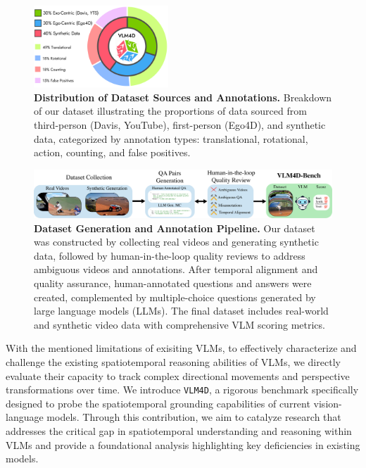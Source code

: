 \begin{figure}[t]
    \centering
    \includegraphics[width=0.45\textwidth]{figures/piechart_dataset_stats.pdf}
    \caption{\textbf{Distribution of Dataset Sources and Annotations.} Breakdown of our dataset illustrating the proportions of data sourced from third-person (Davis, YouTube), first-person (Ego4D), and synthetic data, categorized by annotation types: translational, rotational, action, counting, and false positives.}
    \label{fig:data_piechart}
    \vspace{-0.3cm}
\end{figure}

\begin{figure}[ht]
    \centering
    \includegraphics[width=1\textwidth]{figures/dataset_generation_v2.pdf}
    \caption{\textbf{Dataset Generation and Annotation Pipeline.} Our dataset was constructed by collecting real videos and generating synthetic data, followed by human-in-the-loop quality reviews to address ambiguous videos and annotations. After temporal alignment and quality assurance, human-annotated questions and answers were created, complemented by multiple-choice questions generated by large language models (LLMs). The final dataset includes real-world and synthetic video data with comprehensive VLM scoring metrics.}
    \label{fig:dataset_pipeline}
    \vspace{-0.4cm}
\end{figure}

With the mentioned limitations of exisiting VLMs, to effectively characterize and challenge the existing spatiotemporal reasoning abilities of VLMs, we directly evaluate their capacity to track complex directional movements and perspective transformations over time. We introduce \texttt{VLM4D}, a rigorous benchmark specifically designed to probe the spatiotemporal grounding capabilities of current vision-language models. Through this contribution, we aim to catalyze research that addresses the critical gap in spatiotemporal understanding and reasoning within VLMs and provide a foundational analysis highlighting key deficiencies in existing models. 

